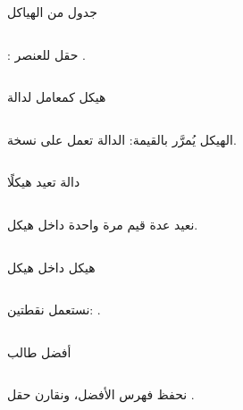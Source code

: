 \documentclass[aspectratio=169, 11pt, t, xcolor={table}]{beamer}
\begin{document}
\begin{frame}[t]{جدول من الهياكل}
    \begin{columns}[T]
        {\small {}: حقل  للعنصر .\par}
        \vspace{0.3cm}
    \end{columns}
\end{frame}

\begin{frame}[t]{هيكل كمعامل لدالة}
    \begin{columns}[T]
        {\small الهيكل يُمرَّر بالقيمة: الدالة تعمل على نسخة.\par}
        \vspace{0.3cm}
    \end{columns}
\end{frame}

\begin{frame}[t]{دالة تعيد هيكلًا}
    \begin{columns}[T]
        {\small نعيد عدة قيم مرة واحدة داخل هيكل.\par}
        \vspace{0.3cm}
    \end{columns}
\end{frame}

\begin{frame}[t]{هيكل داخل هيكل}
    \begin{columns}[T]
        {\small نستعمل نقطتين: .\par}
        \vspace{0.3cm}
    \end{columns}
\end{frame}

\begin{frame}[t]{أفضل طالب}
    \begin{columns}[T]
        {\small نحفظ فهرس الأفضل، ونقارن حقل .\par}
        \vspace{0.3cm}
    \end{columns}
\end{frame}
\end{document}
